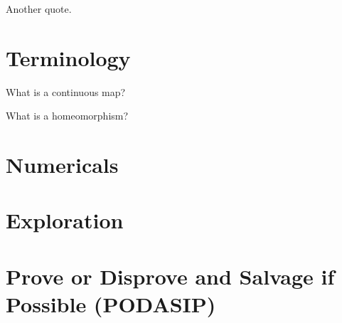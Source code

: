 \documentclass{homework}
\author{Jim Fowler}
\begin{document}
\maketitle

\begin{inspiration}
Another quote.
\end{inspiration}

\section{Terminology}

\begin{problem}
  What is a continuous map?
  \label{continuous-map}
\end{problem}

\begin{problem}
  What is a homeomorphism?
\end{problem}

\section{Numericals}

\begin{problem}
\end{problem}

\section{Exploration}

\begin{problem}
\end{problem}

\section{Prove or Disprove and Salvage if Possible (PODASIP)}

\begin{problem}
\end{problem}
\end{document}
